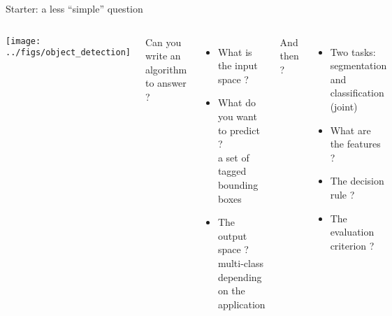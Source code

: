   
\begin{frame}{Starter: a less ``simple'' question}
    \begin{columns}
      \begin{center}
        \texttt{[image: ../figs/object\_detection]}
      \end{center}
      Can you write an algorithm to answer ? 
      \begin{itemize}
      \item What is the input space ? 
      \item What do you want to predict ? \\  a set of tagged bounding boxes
      \item The output space ?\\ multi-class depending on the application
      \end{itemize}
      And then ?\pause
      \begin{itemize}
      \item Two tasks: segmentation and classification (joint)
      \item What are the features ? 
      \item The decision rule ?
      \item The evaluation criterion ? 
      \end{itemize}
    \end{columns}
\end{frame}

